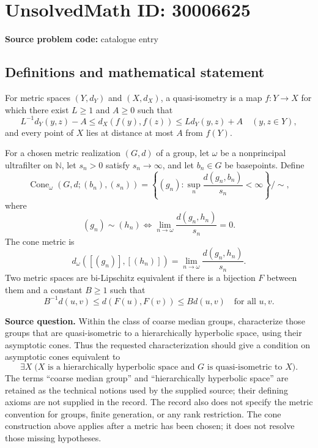 \documentclass[11pt]{article}
\newcommand{\N}{\mathbb{N}}
\begin{document}
\section*{UnsolvedMath ID: 30006625}
\textbf{Source problem code:} catalogue entry
\subsection{Definitions and mathematical statement}
For metric spaces \((Y,d_Y)\) and \((X,d_X)\), a quasi-isometry is a map \(f:Y\to X\) for which there exist \(L\geq 1\) and \(A\geq 0\) such that
\[
L^{-1}d_Y(y,z)-A\leq d_X(f(y),f(z))\leq Ld_Y(y,z)+A
\quad(y,z\in Y),
\]
and every point of \(X\) lies at distance at most \(A\) from \(f(Y)\).

For a chosen metric realization \((G,d)\) of a group, let \(\omega\) be a nonprincipal ultrafilter on \(\N\), let \(s_n>0\) satisfy \(s_n\to\infty\), and let \(b_n\in G\) be basepoints. Define
\[
\operatorname{Cone}_{\omega}(G,d;(b_n),(s_n))
=
\left\{(g_n):\sup_n\frac{d(g_n,b_n)}{s_n}<\infty\right\}\big/\sim,
\]
where
\[
(g_n)\sim(h_n)
\iff
\lim_{n\to\omega}\frac{d(g_n,h_n)}{s_n}=0.
\]
The cone metric is
\[
d_{\omega}([(g_n)],[(h_n)])
=\lim_{n\to\omega}\frac{d(g_n,h_n)}{s_n}.
\]
Two metric spaces are bi-Lipschitz equivalent if there is a bijection \(F\) between them and a constant \(B\geq1\) such that
\[
B^{-1}d(u,v)\leq d(F(u),F(v))\leq B d(u,v)
\quad\text{for all }u,v.
\]

\textbf{Source question.} Within the class of coarse median groups, characterize those groups that are quasi-isometric to a hierarchically hyperbolic space, using their asymptotic cones. Thus the requested characterization should give a condition on asymptotic cones equivalent to
\[
\exists X\;\bigl(X\text{ is a hierarchically hyperbolic space and }G\text{ is quasi-isometric to }X\bigr).
\]
The terms ``coarse median group'' and ``hierarchically hyperbolic space'' are retained as the technical notions used by the supplied source; their defining axioms are not supplied in the record. The record also does not specify the metric convention for groups, finite generation, or any rank restriction. The cone construction above applies after a metric has been chosen; it does not resolve those missing hypotheses.
\end{document}
